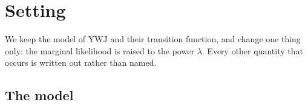 \documentclass[aos]{imsart}
\theoremstyle{plain}
\theoremstyle{definition}
\begin{document}





    \section{Setting}
    \label{sec:setting}

    We keep the model of YWJ and their transition function, and change one
    thing only: the marginal likelihood is raised to the power $\lambda$.
    Every other quantity that occurs is written out rather than named.

    \subsection{The model}
    \label{sub:model}
\end{document}
